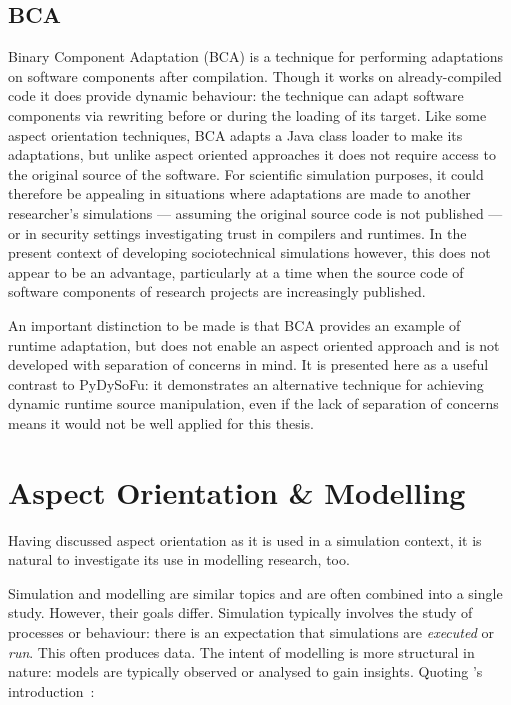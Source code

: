 \subsection{BCA}\label{subsec:BCA} Binary Component
Adaptation\cite{keller1998binary} (BCA) is a technique for performing
adaptations on software components after compilation. Though it works on
already-compiled code it does provide dynamic behaviour: the technique can adapt
software components via rewriting before or during the loading of its target.
Like some aspect orientation techniques, BCA adapts a Java class
loader to make its adaptations, but unlike aspect oriented approaches it does
not require access to the original source of the software. For scientific
simulation purposes, it could therefore be appealing in situations where
adaptations are made to another researcher's simulations --- assuming the
original source code is not published --- or in security settings investigating
trust in compilers and runtimes\cite{trustingtrust}. In the present context of
developing sociotechnical simulations however, this does not appear to be an
advantage, particularly at a time when the source code of software components of
research projects are increasingly published.

An important distinction to be made is that BCA provides an example of runtime
adaptation, but does not enable an aspect oriented approach and is not developed
with separation of concerns in mind. It is presented here as a useful contrast
to PyDySoFu: it demonstrates an alternative technique for achieving dynamic
runtime source manipulation, even if the lack of separation of concerns means it
would not be well applied for this thesis.

\section{Aspect Orientation \& Modelling}


Having discussed aspect orientation as it is used in a simulation context, it is
natural to investigate its use in modelling research, too.

Simulation and modelling are similar topics and are often combined into a single
study. However, their goals differ. Simulation typically involves the study of
processes or behaviour: there is an expectation that simulations are
\emph{executed} or \emph{run}. This often produces data. The intent of modelling
is more structural in nature: models are typically observed or analysed to gain
insights. Quoting \citeauthor{smintro}'s introduction~\cite{smintro}:

